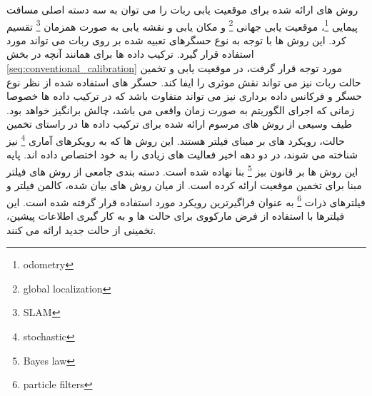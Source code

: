 روش های ارائه شده برای موقعیت یابی ربات را می توان به سه دسته اصلی مسافت پیمایی
\footnote{odometry}،
موقعیت یابی جهانی
\footnote{global localization}
و مکان یابی و نقشه یابی به صورت همزمان
\footnote{SLAM}
تقسیم کرد. این روش ها با توجه به نوع حسگرهای تعبیه شده بر روی ربات می تواند مورد استفاده قرار گیرد. ترکیب داده ها برای همانند آنچه در بخش
\ref{seq:conventional_calibration}
مورد توجه قرار گرفت، در موقعیت یابی و تخمین حالت ربات نیز می تواند نقش موثری را ایفا کند. حسگر های استفاده شده از نظر نوع حسگر و فرکانس داده برداری نیز می تواند متفاوت باشد که در ترکیب داده ها خصوصا زمانی که اجرای الگوریتم به صورت زمان واقعی می باشد، چالش برانگیز خواهد بود. طیف وسیعی از روش های مرسوم ارائه شده برای ترکیب داده ها در راستای تخمین حالت، رویکرد های بر مبنای فیلتر هستند. این روش ها که به رویکرهای آماری 
\footnote{stochastic}
نیز شناخته می شوند، در دو دهه اخیر فعالیت های زیادی را به خود اختصاص داده اند. پایه این روش ها بر قانون بیز
\footnote{Bayes law}
بنا نهاده شده است. 
\cite{panigrahi2022localization} 
دسته بندی جامعی از روش های فیلتر مبنا برای تخمین موقعیت ارائه کرده است. از میان روش های بیان شده، کالمن فیلتر و فیلترهای ذرات
\footnote{particle filters}
به عنوان فراگیرترین رویکرد مورد استفاده قرار گرفته شده است. این فیلترها با استفاده از فرض مارکووی برای حالت ها و به کار گیری اطلاعات پیشین، تخمینی از حالت جدید ارائه می کنند. 






 
 
 
 
 
 
 
 
 
 
 
 
 
 
 